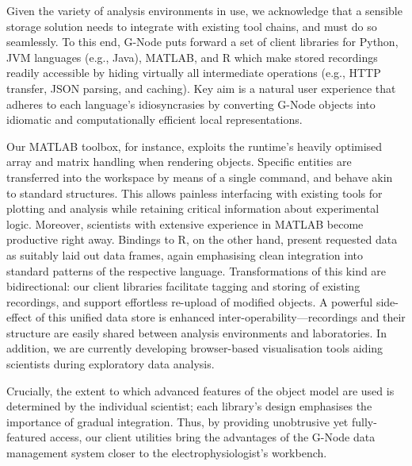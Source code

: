 \documentclass[a4paper]{article}
\begin{document}
Given the variety of analysis environments in use, we acknowledge that
a sensible storage solution needs to integrate with existing tool
chains, and must do so seamlessly. To this end, G-Node puts forward a
set of client libraries for Python, JVM languages (e.g., Java),
MATLAB, and R which make stored recordings readily accessible by
hiding virtually all intermediate operations (e.g., HTTP transfer,
JSON parsing, and caching). Key aim is a natural user experience that
adheres to each language's idiosyncrasies by converting G-Node objects
into idiomatic and computationally efficient local representations.

Our MATLAB toolbox, for instance, exploits the runtime's heavily
optimised array and matrix handling when rendering objects. Specific
entities are transferred into the workspace by means of a single
command, and behave akin to standard structures. This allows painless
interfacing with existing tools for plotting and analysis while
retaining critical information about experimental logic. Moreover,
scientists with extensive experience in MATLAB become productive right
away. Bindings to R, on the other hand, present requested data as
suitably laid out data frames, again emphasising clean integration
into standard patterns of the respective language. Transformations of
this kind are bidirectional: our client libraries facilitate tagging
and storing of existing recordings, and support effortless re-upload
of modified objects. A powerful side-effect of this unified data store
is enhanced inter-operability---recordings and their structure are
easily shared between analysis environments and laboratories. In
addition, we are currently developing browser-based visualisation
tools aiding scientists during exploratory data analysis.

Crucially, the extent to which advanced features of the object model
are used is determined by the individual scientist; each library's
design emphasises the importance of gradual integration. Thus, by
providing unobtrusive yet fully-featured access, our client utilities
bring the advantages of the G-Node data management system closer to
the electrophysiologist's workbench.
\end{document}
